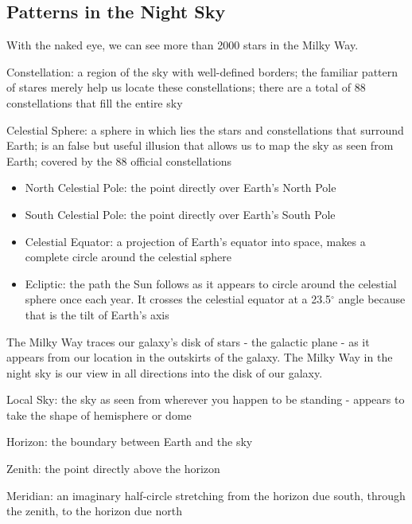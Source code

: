 \documentclass[12pt]{article}
\begin{document}
\subsection{Patterns in the Night Sky} 
With the naked eye, we can see more than 2000 stars in the Milky Way. 
\begin{definition} Constellation: a region of the sky with well-defined borders; the familiar pattern of stares merely help us locate these constellations; there are a total of 88 constellations that fill the entire sky \end{definition}
\begin{definition} Celestial Sphere: a sphere in which lies the stars and constellations that surround Earth; is an false but useful illusion that allows us to map the sky as seen from Earth; covered by the 88 official constellations \end{definition} 
\begin{itemize} 
\item North Celestial Pole: the point directly over Earth's North Pole
\item South Celestial Pole: the point directly over Earth's South Pole
\item Celestial Equator: a projection of Earth's equator into space, makes a complete circle around the celestial sphere 
\item Ecliptic: the path the Sun follows as it appears to circle around the celestial sphere once each year. It crosses the celestial equator at a 23.5$^\circ$ angle because that is the tilt of Earth's axis \end{itemize} 
The Milky Way traces our galaxy's disk of stars - the galactic plane - as it appears from our location in the outskirts of the galaxy. The Milky Way in the night sky is our view in all directions into the disk of our galaxy. 
\begin{definition} Local Sky: the sky as seen from wherever you happen to be standing - appears to take the shape of hemisphere or dome \end{definition}
\begin{definition} Horizon: the boundary between Earth and the sky \end{definition}
\begin{definition} Zenith: the point directly above the horizon \end{definition}
\begin{definition} Meridian: an imaginary half-circle stretching from the horizon due south, through the zenith, to the horizon due north \end{definition}
\end{document}
